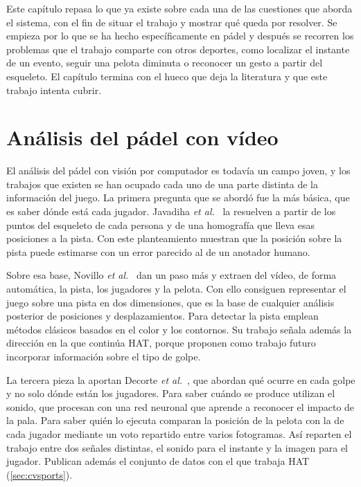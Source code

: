 
Este capítulo repasa lo que ya existe sobre cada una de las cuestiones que aborda el sistema, con el fin de situar el trabajo y mostrar qué queda por resolver.
Se empieza por lo que se ha hecho específicamente en pádel y después se recorren los problemas que el trabajo comparte con otros deportes, como localizar el instante de un evento, seguir una pelota diminuta o reconocer un gesto a partir del esqueleto.
El capítulo termina con el hueco que deja la literatura y que este trabajo intenta cubrir.

\section{Análisis del pádel con vídeo}
\label{sec:arte-padel}

El análisis del pádel con visión por computador es todavía un campo joven, y los trabajos que existen se han ocupado cada uno de una parte distinta de la información del juego.
La primera pregunta que se abordó fue la más básica, que es saber dónde está cada jugador.
Javadiha \textit{et al.}~\cite{javadiha2021positions} la resuelven a partir de los puntos del esqueleto de cada persona y de una homografía que lleva esas posiciones a la pista.
Con este planteamiento muestran que la posición sobre la pista puede estimarse con un error parecido al de un anotador humano.

Sobre esa base, Novillo \textit{et al.}~\cite{novillo2025padel} dan un paso más y extraen del vídeo, de forma automática, la pista, los jugadores y la pelota.
Con ello consiguen representar el juego sobre una pista en dos dimensiones, que es la base de cualquier análisis posterior de posiciones y desplazamientos.
Para detectar la pista emplean métodos clásicos basados en el color y los contornos.
Su trabajo señala además la dirección en la que continúa HAT, porque proponen como trabajo futuro incorporar información sobre el tipo de golpe.

La tercera pieza la aportan Decorte \textit{et al.}~\cite{decorte2024padel}, que abordan qué ocurre en cada golpe y no solo dónde están los jugadores.
Para saber cuándo se produce utilizan el sonido, que procesan con una red neuronal que aprende a reconocer el impacto de la pala.
Para saber quién lo ejecuta comparan la posición de la pelota con la de cada jugador mediante un voto repartido entre varios fotogramas.
Así reparten el trabajo entre dos señales distintas, el sonido para el instante y la imagen para el jugador.
Publican además el conjunto de datos con el que trabaja HAT (\cref{sec:cvsports}).

